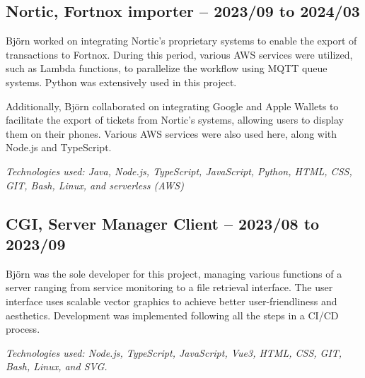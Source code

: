 \subsection*{\textcolor{colorTitelErfarenhet}{Nortic, Fortnox importer – 2023/09 to 2024/03}}
Björn worked on integrating Nortic's proprietary systems to enable the export of transactions to Fortnox. During this period, various AWS services were utilized, such as Lambda functions, to parallelize the workflow using MQTT queue systems. Python was extensively used in this project.

Additionally, Björn collaborated on integrating Google and Apple Wallets to facilitate the export of tickets from Nortic's systems, allowing users to display them on their phones. Various AWS services were also used here, along with Node.js and TypeScript.

\vspace{5pt}\textit{Technologies used: Java, Node.js, TypeScript, JavaScript, Python, HTML, CSS, GIT, Bash, Linux, and serverless (AWS)}

\vspace{15pt} %
\subsection*{\textcolor{colorTitelErfarenhet}{CGI, Server Manager Client – 2023/08 to 2023/09}}
Björn was the sole developer for this project, managing various functions of a server ranging from service monitoring to a file retrieval interface. The user interface uses scalable vector graphics to achieve better user-friendliness and aesthetics. Development was implemented following all the steps in a CI/CD process.

\vspace{5pt}\textit{Technologies used: Node.js, TypeScript, JavaScript, Vue3, HTML, CSS, GIT, Bash, Linux, and SVG.}